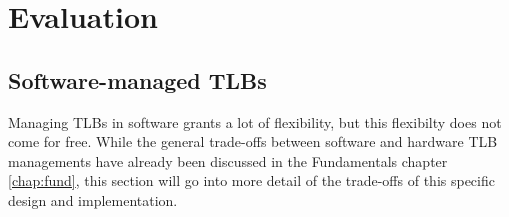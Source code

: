 \chapter{Evaluation}
\label{chap:eval}











\section{Software-managed TLBs}
Managing TLBs in software grants a lot of flexibility, but this flexibilty does not come
for free. While the general trade-offs between software and hardware TLB managements have
already been discussed in the Fundamentals chapter \ref{chap:fund}, this section will
go into more detail of the trade-offs of this specific design and implementation.

